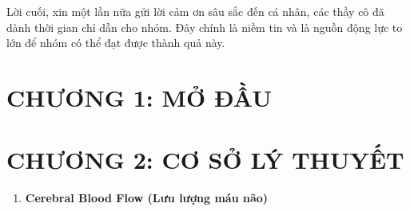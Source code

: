 \documentclass[12pt,a4paper]{article}
\begin{document}
Lời cuối, xin một lần nữa gửi lời cảm ơn sâu sắc đến cá nhân, các thầy cô đã dành thời gian chỉ dẫn cho nhóm. Đây chính là niềm tin và là nguồn động lực to lớn để nhóm có thể đạt được thành quả này.

\newpage
\tableofcontents

\newpage
{}
\section*{CHƯƠNG 1: MỞ ĐẦU}

\newpage
{}
\section*{CHƯƠNG 2: CƠ SỞ LÝ THUYẾT}
\begin{enumerate} [2.1/]
	\item \textbf{Cerebral Blood Flow (Lưu lượng máu não)}
\end{enumerate}
\end{document}
